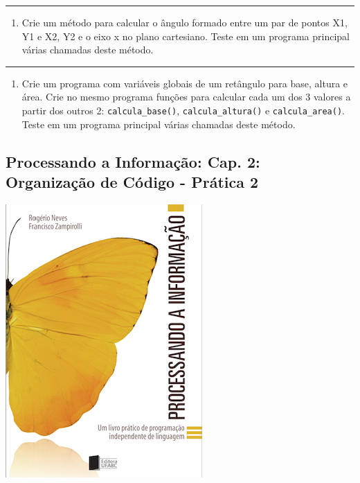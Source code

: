 \documentclass[12pt,a4paper]{article}
\renewcommand{\linethickness}{0.05em}
\providecommand{\tightlist}{%
      \setlength{\itemsep}{0pt}\setlength{\parskip}{0pt}}
\begin{document}
    \begin{center}\rule{0.5\linewidth}{\linethickness}\end{center}

\begin{enumerate}
\def\labelenumi{\arabic{enumi}.}
\setcounter{enumi}{3}
\tightlist
\item
  Crie um método para calcular o ângulo formado entre um par de pontos
  X1, Y1 e X2, Y2 e o eixo x no plano cartesiano. Teste em um programa
  principal várias chamadas deste método.
\end{enumerate}

    \begin{center}\rule{0.5\linewidth}{\linethickness}\end{center}

\begin{enumerate}
\def\labelenumi{\arabic{enumi}.}
\setcounter{enumi}{4}
\tightlist
\item
  Crie um programa com variáveis globais de um retângulo para base,
  altura e área. Crie no mesmo programa funções para calcular cada um
  dos 3 valores a partir dos outros 2: \texttt{calcula\_base()},
  \texttt{calcula\_altura()} e \texttt{calcula\_area()}. Teste em um
  programa principal várias chamadas deste método.
\end{enumerate}

    \hypertarget{processando-a-informauxe7uxe3o-cap.-2-organizauxe7uxe3o-de-cuxf3digo---pruxe1tica-2}{%
\subsection{Processando a Informação: Cap. 2: Organização de Código -
Prática
2}\label{processando-a-informauxe7uxe3o-cap.-2-organizauxe7uxe3o-de-cuxf3digo---pruxe1tica-2}}

    \includegraphics{"figs/Capa_Processando_Informacao.jpg"}
\end{document}
